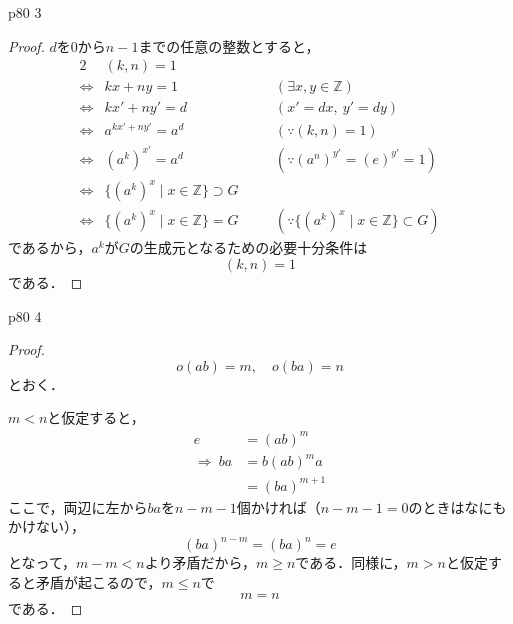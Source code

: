 \documentclass[dvipdfmx,uplatex,11pt]{jsarticle}
\theoremstyle{mytheorem}
\begin{document}
        \newpage
        p80 3 
        \begin{leftbar}
            \begin{proof}
                $d$を$0$から$n-1$までの任意の整数とすると，
                \begin{alignat*}{2}
                    & (k,n)=1 & & \\
                    \iff & kx+ny=1 & \quad & (\exists x,y \in \mathbb{Z}) \\
                    \iff & kx'+ny'=d & \quad & (x'=dx,~y'=dy) \\
                    \iff & a^{kx'+ny'}=a^d & \quad & (\because (k,n)=1) \\
                    \iff & (a^k)^{x'}=a^d & \quad & (\because (a^n)^{y'}=(e)^{y'}=1) \\
                    \iff & \{ (a^k)^x \mid x \in \mathbb{Z}\} \supset G & &\\
                    \iff & \{(a^k)^x \mid x \in \mathbb{Z}\}=G & \quad & (\because \{ (a^k)^x \mid x \in \mathbb{Z}\} \subset G)
                \end{alignat*}
                であるから，$a^k$が$G$の生成元となるための必要十分条件は
                \[
                    (k,n)=1
                \]
                である．
            \end{proof}
        \end{leftbar}
        \newpage
        p80 4 
        \begin{leftbar}
            \begin{proof}
                \[
                    o(ab)=m , \quad o (ba)=n
                \]
                とおく．

                $m<n$と仮定すると，
                \begin{align*}
                     e &= (ab)^m \\
                    \Longrightarrow ~ ba &=b(ab)^m a \\
                    & =(ba)^{m+1}
                \end{align*}
                ここで，両辺に左から$ba$を$n-m-1$個かければ（$n-m-1=0$のときはなにもかけない），
                \[
                    (ba)^{n-m}=(ba)^n=e
                \]
                となって，$m-m<n$より矛盾だから，$m \ge n$である．同様に，$m>n$と仮定すると矛盾が起こるので，$m \le n$で
                \[
                    m=n
                \]
                である．
            \end{proof}
        \end{leftbar}
\end{document}
